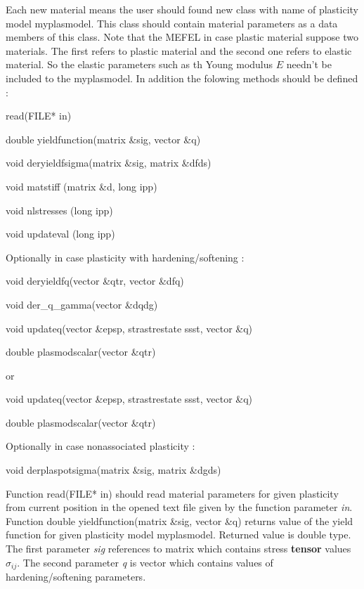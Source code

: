 Each new material means the user should found new class with name of plasticity model {\sf myplasmodel}.
This class should contain material parameters as a data members of this class. Note that the MEFEL
in case plastic material suppose two materials. The first refers to plastic material and the second
one refers to elastic material. So the elastic parameters such as th Young modulus $E$ needn't be
included to the {\sf myplasmodel}. In addition the folowing methods should be defined :
\begin{itemize}
{\sf
\item
read(FILE* in)
\item
double yieldfunction(matrix \&sig, vector \&q)
\item
void deryieldfsigma(matrix \&sig, matrix \&dfds)
\item
void matstiff (matrix \&d, long ipp)
\item
void nlstresses (long ipp)
\item
void updateval (long ipp)
}

Optionally in case plasticity with hardening/softening :
{\sf
\item
void deryieldfq(vector \&qtr, vector \&dfq)
\item
void der\_q\_gamma(vector \&dqdg)
\item
void updateq(vector \&epsp, strastrestate ssst, vector \&q)
\item
double plasmodscalar(vector \&qtr)
}

or
{\sf
\item
void updateq(vector \&epsp, strastrestate ssst, vector \&q)
\item
double plasmodscalar(vector \&qtr)
}

Optionally in case nonassociated plasticity :
{\sf
\item
void derplaspotsigma(matrix \&sig, matrix \&dgds)
}
\end{itemize}

Function {\sf read(FILE* in)} should read material parameters for given plasticity from current
position in the opened text file given by the function parameter {\it in}.\\

Function {\sf double yieldfunction(matrix \&sig, vector \&q)} returns value of the yield function
for given plasticity model {\sf myplasmodel}. Returned value is double type. The first parameter
{\it sig} references to matrix which contains stress {\bf tensor} values $\sigma_{ij}$. The second
parameter {\it q} is vector which contains values of hardening/softening parameters.\\

